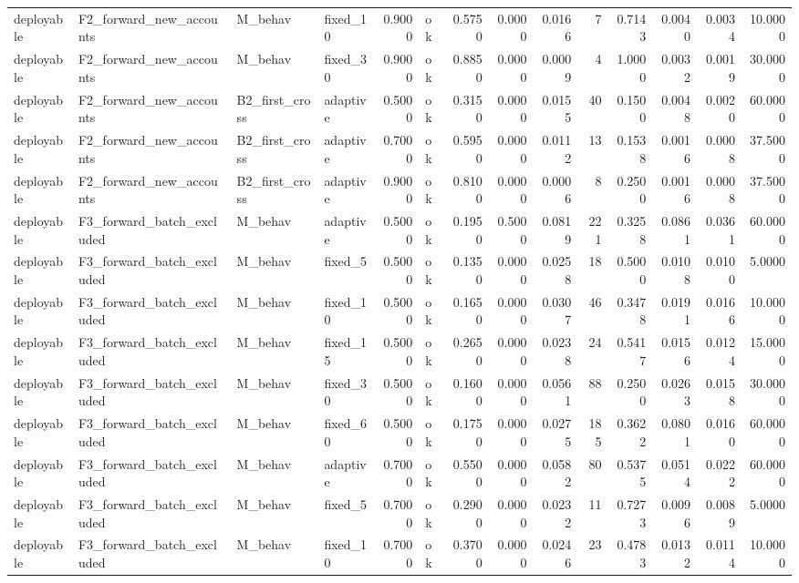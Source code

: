\begin{table}
\begin{tabular}{llllrlrrrrrrrr}
deployable & F2\_forward\_new\_accounts & M\_behav & fixed\_10 & 0.9000 & ok & 0.5750 & 0.0000 & 0.0166 & 7 & 0.7143 & 0.0040 & 0.0034 & 10.0000 \\
deployable & F2\_forward\_new\_accounts & M\_behav & fixed\_30 & 0.9000 & ok & 0.8850 & 0.0000 & 0.0009 & 4 & 1.0000 & 0.0032 & 0.0019 & 30.0000 \\
deployable & F2\_forward\_new\_accounts & B2\_first\_cross & adaptive & 0.5000 & ok & 0.3150 & 0.0000 & 0.0155 & 40 & 0.1500 & 0.0048 & 0.0020 & 60.0000 \\
deployable & F2\_forward\_new\_accounts & B2\_first\_cross & adaptive & 0.7000 & ok & 0.5950 & 0.0000 & 0.0112 & 13 & 0.1538 & 0.0016 & 0.0008 & 37.5000 \\
deployable & F2\_forward\_new\_accounts & B2\_first\_cross & adaptive & 0.9000 & ok & 0.8100 & 0.0000 & 0.0006 & 8 & 0.2500 & 0.0016 & 0.0008 & 37.5000 \\
deployable & F3\_forward\_batch\_excluded & M\_behav & adaptive & 0.5000 & ok & 0.1950 & 0.5000 & 0.0819 & 221 & 0.3258 & 0.0861 & 0.0361 & 60.0000 \\
deployable & F3\_forward\_batch\_excluded & M\_behav & fixed\_5 & 0.5000 & ok & 0.1350 & 0.0000 & 0.0258 & 18 & 0.5000 & 0.0108 & 0.0100 & 5.0000 \\
deployable & F3\_forward\_batch\_excluded & M\_behav & fixed\_10 & 0.5000 & ok & 0.1650 & 0.0000 & 0.0307 & 46 & 0.3478 & 0.0191 & 0.0166 & 10.0000 \\
deployable & F3\_forward\_batch\_excluded & M\_behav & fixed\_15 & 0.5000 & ok & 0.2650 & 0.0000 & 0.0238 & 24 & 0.5417 & 0.0156 & 0.0124 & 15.0000 \\
deployable & F3\_forward\_batch\_excluded & M\_behav & fixed\_30 & 0.5000 & ok & 0.1600 & 0.0000 & 0.0561 & 88 & 0.2500 & 0.0263 & 0.0158 & 30.0000 \\
deployable & F3\_forward\_batch\_excluded & M\_behav & fixed\_60 & 0.5000 & ok & 0.1750 & 0.0000 & 0.0275 & 185 & 0.3622 & 0.0801 & 0.0160 & 60.0000 \\
deployable & F3\_forward\_batch\_excluded & M\_behav & adaptive & 0.7000 & ok & 0.5500 & 0.0000 & 0.0582 & 80 & 0.5375 & 0.0514 & 0.0222 & 60.0000 \\
deployable & F3\_forward\_batch\_excluded & M\_behav & fixed\_5 & 0.7000 & ok & 0.2900 & 0.0000 & 0.0232 & 11 & 0.7273 & 0.0096 & 0.0089 & 5.0000 \\
deployable & F3\_forward\_batch\_excluded & M\_behav & fixed\_10 & 0.7000 & ok & 0.3700 & 0.0000 & 0.0246 & 23 & 0.4783 & 0.0132 & 0.0114 & 10.0000 \\

\end{tabular}
\end{table}
